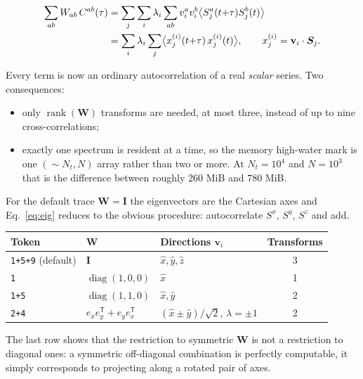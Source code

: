 \documentclass[12pt, a4paper, oneside]{article}
\newcommand{\vvec}{\mathbf{v}}
\newcommand{\Nt}{N_t}
\newcommand{\Na}{N}
\newcommand{\field}{S}
\newcommand{\Wmat}{\mathbf{W}}
\newcommand{\Imat}{\mathbf{I}}
\begin{document}
\begin{align}
    \sum_{ab} W_{ab}\,C^{ab}(\tau)
    &= \sum_j \sum_i \lambda_i \sum_{ab} v_i^a v_i^b
        \bigl\langle \field_j^a(t{+}\tau)\field_j^b(t)\bigr\rangle \notag\\
    &= \sum_i \lambda_i \sum_j
        \bigl\langle x_j^{(i)}(t{+}\tau)\,x_j^{(i)}(t)\bigr\rangle,
    \qquad x_j^{(i)} = \vvec_i\cdot\bm{\field}_j .
    \label{eq:eig}
\end{align}

Every term is now an ordinary autocorrelation of a real \emph{scalar} series.
Two consequences:

\begin{itemize}
    \item only $\operatorname{rank}(\Wmat)$ transforms are needed, at most
    three, instead of up to nine cross-correlations;
    \item exactly one spectrum is resident at a time, so the memory high-water
    mark is one $(\!\sim\!\Nt,\Na)$ array rather than two or more. At
    $\Nt = 10^4$ and $\Na = 10^3$ that is the difference between roughly
    $260$ MiB and $780$ MiB.
\end{itemize}

For the default trace $\Wmat = \Imat$ the eigenvectors are the Cartesian axes
and Eq.~\eqref{eq:eig} reduces to the obvious procedure: autocorrelate
$\field^x$, $\field^y$, $\field^z$ and add.

\begin{center}
\begin{tabular}{lllc}
    \toprule
    Token & $\Wmat$ & Directions $\vvec_i$ & Transforms \\
    \midrule
    \texttt{1+5+9} (default) & $\Imat$ & $\hat x,\hat y,\hat z$ & 3 \\
    \texttt{1} & $\operatorname{diag}(1,0,0)$ & $\hat x$ & 1 \\
    \texttt{1+5} & $\operatorname{diag}(1,1,0)$ & $\hat x,\hat y$ & 2 \\
    \texttt{2+4} & $e_xe_y^{\mathsf T}+e_ye_x^{\mathsf T}$ & $(\hat x\pm\hat y)/\sqrt2$, $\lambda=\pm1$ & 2 \\
    \bottomrule
\end{tabular}
\end{center}

The last row shows that the restriction to symmetric $\Wmat$ is not a
restriction to diagonal ones: a symmetric off-diagonal combination is perfectly
computable, it simply corresponds to projecting along a rotated pair of axes.
\end{document}
